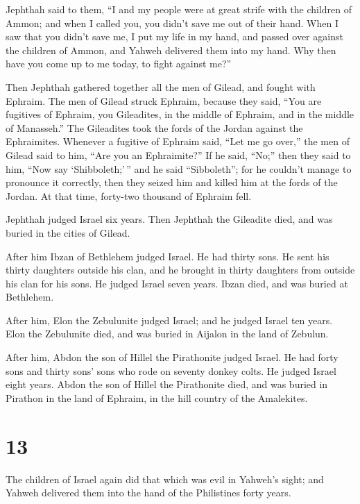  Jephthah said to them, ``I and my people were at great
strife with the children of Ammon; and when I called you, you didn't
save me out of their hand.  When I saw that you didn't save
me, I put my life in my hand, and passed over against the children of
Ammon, and Yahweh delivered them into my hand. Why then have you come up
to me today, to fight against me?''

 Then Jephthah gathered together all the men of Gilead, and
fought with Ephraim. The men of Gilead struck Ephraim, because they
said, ``You are fugitives of Ephraim, you Gileadites, in the middle of
Ephraim, and in the middle of Manasseh.''  The Gileadites
took the fords of the Jordan against the Ephraimites. Whenever a
fugitive of Ephraim said, ``Let me go over,'' the men of Gilead said to
him, ``Are you an Ephraimite?'' If he said, ``No;''  then
they said to him, ``Now say `Shibboleth;'\,'' and he said ``Sibboleth'';
for he couldn't manage to pronounce it correctly, then they seized him
and killed him at the fords of the Jordan. At that time, forty-two
thousand of Ephraim fell.

 Jephthah judged Israel six years. Then Jephthah the
Gileadite died, and was buried in the cities of Gilead.

 After him Ibzan of Bethlehem judged Israel.  He
had thirty sons. He sent his thirty daughters outside his clan, and he
brought in thirty daughters from outside his clan for his sons. He
judged Israel seven years.  Ibzan died, and was buried at
Bethlehem.

 After him, Elon the Zebulunite judged Israel; and he
judged Israel ten years.  Elon the Zebulunite died, and was
buried in Aijalon in the land of Zebulun.

 After him, Abdon the son of Hillel the Pirathonite judged
Israel.  He had forty sons and thirty sons' sons who rode
on seventy donkey colts. He judged Israel eight years. 
Abdon the son of Hillel the Pirathonite died, and was buried in Pirathon
in the land of Ephraim, in the hill country of the Amalekites.

\hypertarget{section-12}{%
\section{13}\label{section-12}}

 The children of Israel again did that which was evil in
Yahweh's sight; and Yahweh delivered them into the hand of the
Philistines forty years.

